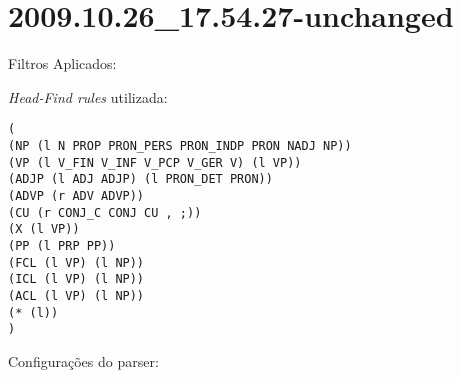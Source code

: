 \section{2009.10.26_17.54.27-unchanged} %
\label{sec:exp:2009.10.26_17.54.27-unchanged}

Filtros Aplicados:

\begin{itemize}
  
\end{itemize}

\emph{Head-Find rules} utilizada:

\scriptsize
\begin{verbatim}
(
(NP (l N PROP PRON_PERS PRON_INDP PRON NADJ NP))
(VP (l V_FIN V_INF V_PCP V_GER V) (l VP))
(ADJP (l ADJ ADJP) (l PRON_DET PRON))
(ADVP (r ADV ADVP))
(CU (r CONJ_C CONJ CU , ;))
(X (l VP))
(PP (l PRP PP))
(FCL (l VP) (l NP))
(ICL (l VP) (l NP))
(ACL (l VP) (l NP))
(* (l))
)

\end{verbatim}

\normalsize

Configurações do parser:

